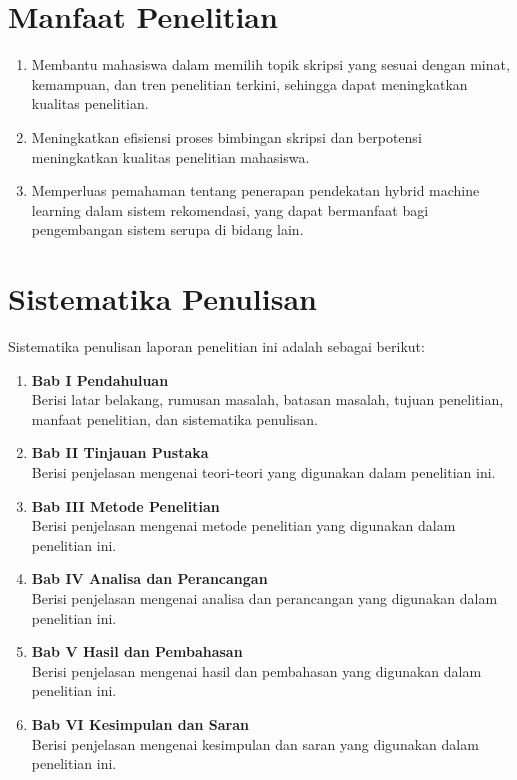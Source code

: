 \section{Manfaat Penelitian}
    \begin{enumerate}
        \item Membantu mahasiswa dalam memilih topik skripsi yang sesuai dengan minat, kemampuan, dan tren penelitian terkini, sehingga dapat meningkatkan kualitas penelitian.
        \item Meningkatkan efisiensi proses bimbingan skripsi dan berpotensi meningkatkan kualitas penelitian mahasiswa.
        \item Memperluas pemahaman tentang penerapan pendekatan hybrid machine learning dalam sistem rekomendasi, yang dapat bermanfaat bagi pengembangan sistem serupa di bidang lain.
    \end{enumerate}

\section{Sistematika Penulisan}
Sistematika penulisan laporan penelitian ini adalah sebagai berikut:

\begin{enumerate}
    \item \textbf{Bab I Pendahuluan} \\ 
    Berisi latar belakang, rumusan masalah, batasan masalah, tujuan penelitian, manfaat penelitian, dan sistematika penulisan.
    \item \textbf{Bab II Tinjauan Pustaka} \\ 
    Berisi penjelasan mengenai teori-teori yang digunakan dalam penelitian ini.
    \item \textbf{Bab III Metode Penelitian} \\ 
    Berisi penjelasan mengenai metode penelitian yang digunakan dalam penelitian ini.
    \item \textbf{Bab IV Analisa dan Perancangan} \\ 
    Berisi penjelasan mengenai analisa dan perancangan yang digunakan dalam penelitian ini.
    \item \textbf{Bab V Hasil dan Pembahasan} \\ 
    Berisi penjelasan mengenai hasil dan pembahasan yang digunakan dalam penelitian ini.
    \item \textbf{Bab VI Kesimpulan dan Saran} \\ 
    Berisi penjelasan mengenai kesimpulan dan saran yang digunakan dalam penelitian ini.
\end{enumerate}


